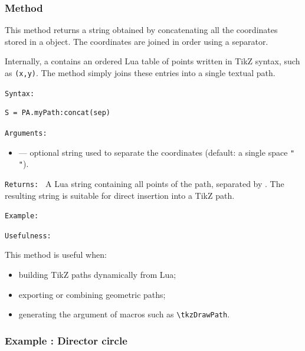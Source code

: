 \subsubsection{Method }
\label{ssub:path_concat}

This method returns a string obtained by concatenating all the coordinates stored
in a  object. The coordinates are joined in order using a
separator.

\medskip
Internally, a  contains an ordered Lua table of points written in
TikZ syntax, such as \verb|(x,y)|. The  method simply
joins these entries into a single textual path.

\medskip
\texttt{Syntax: }
\begin{verbatim}
S = PA.myPath:concat(sep)
\end{verbatim}

\medskip
\texttt{Arguments: }
\begin{itemize}
  \item {} — optional string used to separate the coordinates
        (default: a single space \verb|" "|).
\end{itemize}

\medskip
\texttt{Returns: }
A Lua string containing all points of the path, separated by .
The resulting string is suitable for direct insertion into a TikZ path.

\texttt{Example: }

\begin{tkzexample}
\end{tkzexample}


\texttt{Usefulness: }

This method is useful when:
\begin{itemize}
  \item building TikZ paths dynamically from Lua;
  \item exporting or combining geometric paths;
  \item generating the argument of macros such as \verb|\tkzDrawPath|.
\end{itemize}


\subsubsection{Example : Director circle }
\label{ssub:director_circle}


